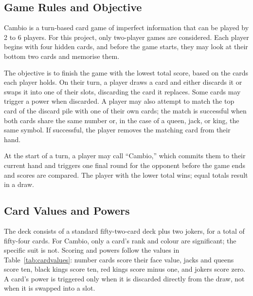\documentclass[12pt,a4paper,oneside]{report}
\begin{document}
\subsection{Game Rules and Objective}

Cambio is a turn‑based card game of imperfect information that can be played by 2 to 6 players. For this project, only two-player games are considered. Each player begins with four hidden cards, and before the game starts, they may look at their bottom two cards and memorise them.

The objective is to finish the game with the lowest total score, based on the cards each player holds. On their turn, a player draws a card and either discards it or swaps it into one of their slots, discarding the card it replaces. Some cards may trigger a power when discarded. A player may also attempt to match the top card of the discard pile with one of their own cards; the match is successful when both cards share the same number or, in the case of a queen, jack, or king, the same symbol. If successful, the player removes the matching card from their hand.

At the start of a turn, a player may call “Cambio,” which commits them to their current hand and triggers one final round for the opponent before the game ends and scores are compared. The player with the lower total wins; equal totals result in a draw.


\subsection{Card Values and Powers}

The deck consists of a standard fifty-two-card deck plus two jokers, for a total of
fifty-four cards. For Cambio, only a card's rank and colour are
significant; the specific suit is not. Scoring and powers follow the values in
Table~\ref{tab:cardvalues}: number cards score their face value, jacks and queens score
ten, black kings score ten, red kings score minus one, and jokers score zero. A card’s power is triggered only when it is discarded directly from the draw, not when it is swapped into a slot.
\end{document}
